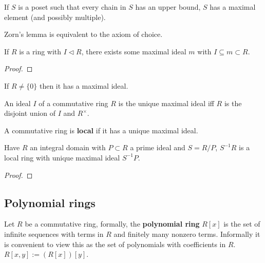 \documentclass{report}
\begin{document}
\begin{axiom}
    If $S$ is a poset such that every chain in $S$ has an upper bound, $S$ has a maximal element (and possibly multiple).
\end{axiom}

\begin{remark}
    Zorn's lemma is equivalent to the axiom of choice.
\end{remark}

\begin{theorem}
    If $R$ is a ring with $I\lhd R$, there exists some maximal ideal $m$ with $I\subseteq m\subset R$. \begin{proof}
        
    \end{proof}
\end{theorem}

\begin{corollary}
    If $R\neq\{0\}$ then it has a maximal ideal.
\end{corollary}

\begin{proposition}
    An ideal $I$ of a commutative ring $R$ is the unique maximal ideal iff $R$ is the disjoint union of $I$ and $R^\times$.
\end{proposition}

\begin{definition}[Local]
    A commutative ring is \textbf{local} if it has a unique maximal ideal.
\end{definition}

\begin{proposition}
    Have $R$ an integral domain with $P\subset R$ a prime ideal and $S=R/P$, $S^{-1}R$ is a local ring with unique maximal ideal $S^{-1}P$. \begin{proof}
        
    \end{proof}
\end{proposition}

\subsection{Polynomial rings}

\begin{definition}
    Let $R$ be a commutative ring, formally, the \textbf{polynomial ring} $R[x]$ is the set of infinite sequences with terms in $R$ and finitely many nonzero terms. Informally it is convenient to view this as the set of polynomials with coefficients in $R$. $R[x,y]:=(R[x])[y]$.
\end{definition}
\end{document}
